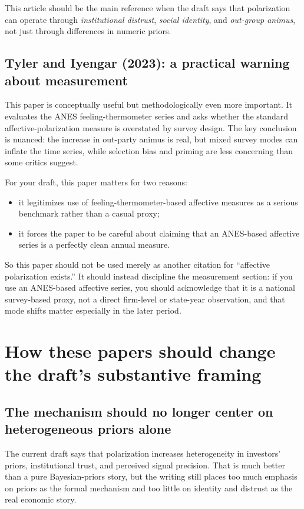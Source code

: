 \documentclass[12pt]{article}
\begin{document}
This article should be the main reference when the draft says that polarization can operate through \emph{institutional distrust}, \emph{social identity}, and \emph{out-group animus}, not just through differences in numeric priors.

\subsection{Tyler and Iyengar (2023): a practical warning about measurement}

This paper is conceptually useful but methodologically even more important. It evaluates the ANES feeling-thermometer series and asks whether the standard affective-polarization measure is overstated by survey design. The key conclusion is nuanced: the increase in out-party animus is real, but mixed survey modes can inflate the time series, while selection bias and priming are less concerning than some critics suggest.

For your draft, this paper matters for two reasons:
\begin{itemize}
    \item it legitimizes use of feeling-thermometer-based affective measures as a serious benchmark rather than a casual proxy;
    \item it forces the paper to be careful about claiming that an ANES-based affective series is a perfectly clean annual measure.
\end{itemize}

So this paper should not be used merely as another citation for ``affective polarization exists.'' It should instead discipline the measurement section: if you use an ANES-based affective series, you should acknowledge that it is a national survey-based proxy, not a direct firm-level or state-year observation, and that mode shifts matter especially in the later period.

\section{How these papers should change the draft's substantive framing}

\subsection{The mechanism should no longer center on heterogeneous priors alone}

The current draft says that polarization increases heterogeneity in investors' priors, institutional trust, and perceived signal precision. That is much better than a pure Bayesian-priors story, but the writing still places too much emphasis on priors as the formal mechanism and too little on identity and distrust as the real economic story.
\end{document}
